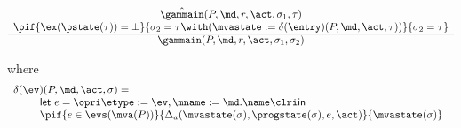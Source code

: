 \[
\begin{array}{c}
\hat\gammain(P, \md, r, \act, \sigma_1, \tau) \\
\pif{\ex(\pstate(\tau)) = \bot}
    {\sigma_2 = \tau \with (\mvastate := \delta(\entry)(P, \md, \act, \tau))}
    {\sigma_2 = \tau}\\
\hline
\gammain(P, \md, r, \act, \sigma_1, \sigma_2)
\end{array}
\]

\noindent where
\[
\begin{array}{l}
\delta(\ev)(P, \md, \act, \sigma) =\\
\qquad
\begin{array}[t]{l}
\mathsf{let\ } e = \opri \etype := \ev, \mname := \md.\name \clri
\mathsf{in\ }\\
\pif{e \in \evs(\mva(P))}{\Delta_a(\mvastate(\sigma),
\progstate(\sigma), e, \act)}{\mvastate(\sigma)}
\end{array}
\end{array}
\]










